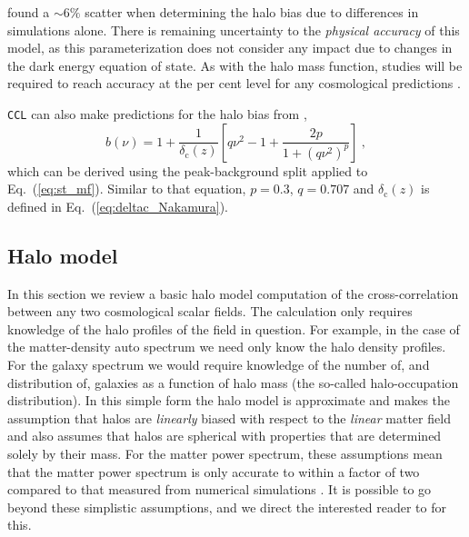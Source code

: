 \documentclass[\docopts]{\docclass}
\newcommand{\ccl}{{\tt CCL}\xspace}
\begin{document}
\citet{Tinker2010} found a $\sim6\%$ scatter when determining the halo bias due to differences in simulations alone. There is remaining uncertainty to the {\em physical accuracy} of this model, as this parameterization does not consider any impact due to changes in the dark energy equation of state. As with the halo mass function, studies will be required to reach accuracy at the per cent level for any cosmological predictions \cite[][e.g.]{Gao2005, Schulz2006, Smith2007, Croton2007, Parfrey2011, Sunayama2016, Villarreal2017, Mao2018}.

\ccl can also make predictions for the halo bias from \cite{Sheth1999},
\begin{equation}
b(\nu)=1+\frac{1}{\delta_\mathrm{c}(z)}\left[q\nu^2-1+\frac{2p}{1+(q\nu^2)^p}\right]\ ,
\label{eq:st_bias}
\end{equation}
which can be derived using the peak-background split applied to Eq.~(\ref{eq:st_mf}). Similar to that equation, $p=0.3$, $q=0.707$ and $\delta_\mathrm{c}(z)$ is defined in Eq.~(\ref{eq:deltac_Nakamura}).


\subsection{Halo model}
\label{sec:halo_model}

In this section we review a basic halo model computation \citep{Seljak2000,Peacock2000,Cooray2002} of the cross-correlation between any two cosmological scalar fields. The calculation only requires knowledge of the halo profiles of the field in question. For example, in the case of the matter-density auto spectrum we need only know the halo density profiles. For the galaxy spectrum we would require knowledge of the number of, and distribution of, galaxies as a function of halo mass (the so-called halo-occupation distribution). In this simple form the halo model is approximate and makes the assumption that halos are \emph{linearly} biased with respect to the \emph{linear} matter field and also assumes that halos are spherical with properties that are determined solely by their mass. For the matter power spectrum, these assumptions mean that the matter power spectrum is only accurate to within a factor of two compared to that measured from numerical simulations \citep{Mead2015}. It is possible to go beyond these simplistic assumptions, and we direct the interested reader to \cite{Cooray2002,Smith2007,Giocoli2010,Smith2011} for this.
\end{document}
